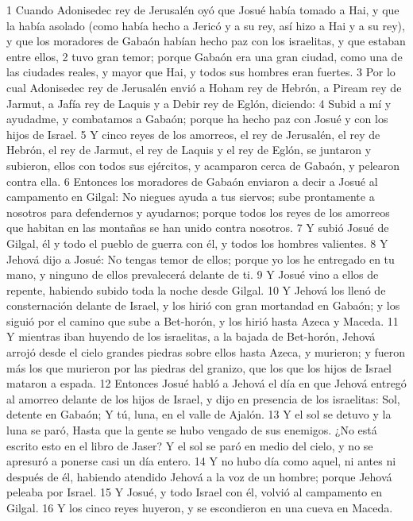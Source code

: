 1 Cuando Adonisedec rey de Jerusalén oyó que Josué había tomado a Hai, y que la había asolado (como había hecho a Jericó y a su rey, así hizo a Hai y a su rey), y que los moradores de Gabaón habían hecho paz con los israelitas, y que estaban entre ellos,
2 tuvo gran temor; porque Gabaón era una gran ciudad, como una de las ciudades reales, y mayor que Hai, y todos sus hombres eran fuertes.
3 Por lo cual Adonisedec rey de Jerusalén envió a Hoham rey de Hebrón, a Piream rey de Jarmut, a Jafía rey de Laquis y a Debir rey de Eglón, diciendo:
4 Subid a mí y ayudadme, y combatamos a Gabaón; porque ha hecho paz con Josué y con los hijos de Israel.
5 Y cinco reyes de los amorreos, el rey de Jerusalén, el rey de Hebrón, el rey de Jarmut, el rey de Laquis y el rey de Eglón, se juntaron y subieron, ellos con todos sus ejércitos, y acamparon cerca de Gabaón, y pelearon contra ella.
6 Entonces los moradores de Gabaón enviaron a decir a Josué al campamento en Gilgal: No niegues ayuda a tus siervos; sube prontamente a nosotros para defendernos y ayudarnos; porque todos los reyes de los amorreos que habitan en las montañas se han unido contra nosotros.
7 Y subió Josué de Gilgal, él y todo el pueblo de guerra con él, y todos los hombres valientes.
8 Y Jehová dijo a Josué: No tengas temor de ellos; porque yo los he entregado en tu mano, y ninguno de ellos prevalecerá delante de ti.
9 Y Josué vino a ellos de repente, habiendo subido toda la noche desde Gilgal.
10 Y Jehová los llenó de consternación delante de Israel, y los hirió con gran mortandad en Gabaón; y los siguió por el camino que sube a Bet-horón, y los hirió hasta Azeca y Maceda.
11 Y mientras iban huyendo de los israelitas, a la bajada de Bet-horón, Jehová arrojó desde el cielo grandes piedras sobre ellos hasta Azeca, y murieron; y fueron más los que murieron por las piedras del granizo, que los que los hijos de Israel mataron a espada.
12 Entonces Josué habló a Jehová el día en que Jehová entregó al amorreo delante de los hijos de Israel, y dijo en presencia de los israelitas:
Sol, detente en Gabaón;
Y tú, luna, en el valle de Ajalón. 
13 Y el sol se detuvo y la luna se paró,
Hasta que la gente se hubo vengado de sus enemigos.
¿No está escrito esto en el libro de Jaser? Y el sol se paró en medio del cielo, y no se apresuró a ponerse casi un día entero.
14 Y no hubo día como aquel, ni antes ni después de él, habiendo atendido Jehová a la voz de un hombre; porque Jehová peleaba por Israel.
15 Y Josué, y todo Israel con él, volvió al campamento en Gilgal.
16 Y los cinco reyes huyeron, y se escondieron en una cueva en Maceda.
